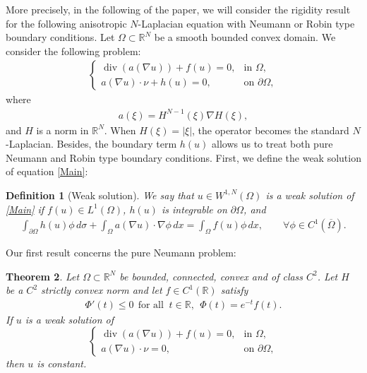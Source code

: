 \documentclass[10pt,a4paper]{amsart}
\numberwithin{equation}{section}
\newtheorem{thm}{Theorem}[section]
\newtheorem{defn}[thm]{Definition}
\newcommand{\R}{\mathbb{R}}
\begin{document}
More precisely, in the following of the  paper,  we will consider the rigidity result for the following anisotropic $N$-Laplacian equation with Neumann or Robin type boundary conditions. Let $\Omega\subset\mathbb{R}^N$ be a smooth bounded convex domain. We consider  the following problem:
\begin{align}\label{Main}
    \begin{cases}
        \operatorname{div}(a(\nabla u))+f(u)=0,&\text{in }\Omega,\\
        a(\nabla u)\cdot\nu+h(u)=0,&\text{on }\partial\Omega,
    \end{cases}
\end{align}
where
   \begin{align*}
         a(\xi)=H^{N-1}(\xi)\nabla H(\xi),
   \end{align*}
and $H$ is a norm in $\mathbb{R}^N$. When $H(\xi)=|\xi|$, the operator becomes the standard $N$-Laplacian. Besides, the boundary term $h(u)$ allows us to treat both pure Neumann and Robin type boundary conditions. First, we define the weak solution of equation \eqref{Main}:

\begin{defn}[Weak solution]\label{def:weak-solution-main}
We say that $u\in W^{1,N}(\Omega)$ is a weak solution of \eqref{Main} if $f(u)\in L^1(\Omega)$, $h(u)$ is integrable on $\partial\Omega$, and
\begin{align}\label{weak-form}
        \int_{\partial\Omega} h(u)\phi\,d\sigma
        +\int_{\Omega} a(\nabla u)\cdot\nabla\phi\,dx
        =\int_{\Omega} f(u)\phi\,dx,
        \qquad \forall\phi\in C^1(\overline\Omega).
\end{align}
\end{defn}

Our first result concerns the pure Neumann problem:

\begin{thm}\label{Thm1}
Let $\Omega\subset\R^N$ be bounded, connected, convex and of class $C^2$.  Let $H$ be a $C^2$ strictly convex norm and let $f\in C^1(\R)$ satisfy
\begin{align}\label{Thm1-assumption}
        \Phi'(t)\le 0 \ \ \text{for all }\ t\in\R, \ \ \Phi(t)=e^{-t}f(t).
\end{align}
If $u$ is a weak solution of
\begin{equation}\label{Thm1-equ}
    \begin{cases}
        \operatorname{div}(a(\nabla u))+f(u)=0, &\text{in }\Omega,\\
        a(\nabla u)\cdot\nu=0, &\text{on }\partial\Omega,
    \end{cases}
\end{equation}
then $u$ is constant.
\end{thm}
\end{document}
